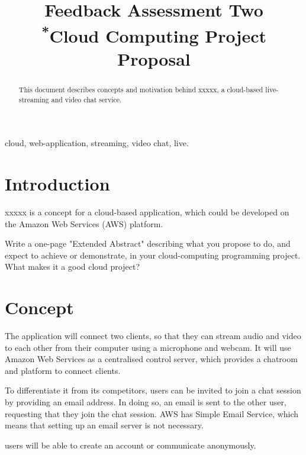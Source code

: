 \documentclass[conference]{IEEEtran}
\begin{document}
\title{Feedback Assessment Two\\
{\footnotesize \textsuperscript{*}Cloud Computing Project Proposal}
}

\author{
}

\maketitle

\begin{abstract}
This document describes concepts and motivation behind xxxxx, a cloud-based live-streaming and video chat service.
\end{abstract}
\begin{IEEEkeywords}
cloud, web-application, streaming, video chat, live.
\end{IEEEkeywords}

\section{Introduction}
xxxxx is a concept for a cloud-based application, which could be developed on the Amazon Web Services (AWS) platform. \par



Write a one-page "Extended Abstract" describing what you propose to do, and expect to achieve or demonstrate, in your cloud-computing programming project.
\\What makes it a good cloud project? 
\section{Concept}
The application will connect two clients, so that they can stream audio and video to each other from their computer using a microphone and webcam. It will use Amazon Web Services as a centralised control server, which provides a chatroom and platform to connect clients. 
\par
To differentiate it from its competitors, users can be invited to join a chat session by providing an email address. In doing so, an email is sent to the other user, requesting that they join the chat session. AWS has Simple Email Service, which means that setting up an email server is not necessary.
\par
 users will be able to create an account or communicate anonymously. 
\par
\end{document}
